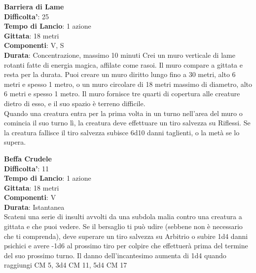 \begin{multicols}{2}
\medskip\textbf{Barriera di Lame}\\
\textbf{Difficolta'}: 25\\
\textbf{Tempo di Lancio}: 1 azione\\
\textbf{Gittata}: 18 metri\\
\textbf{Componenti}: V, S\\
\textbf{Durata}: Concentrazione, massimo 10 minuti Crei un muro verticale di lame rotanti fatte di energia magica, affilate come rasoi. Il muro compare a gittata e resta per la durata. Puoi creare un muro diritto lungo fino a 30 metri, alto 6 metri e spesso 1 metro, o un muro circolare di 18 metri massimo di diametro, alto 6 metri e spesso 1 metro. Il muro fornisce tre quarti di copertura alle creature dietro di esso, e il suo spazio è terreno difficile. \\
Quando una creatura entra per la prima volta in un turno nell’area del muro o comincia il suo turno lì, la creatura deve effettuare un tiro salvezza su Riflessi. Se la creatura fallisce il tiro salvezza subisce 6d10 danni taglienti, o la metà se lo supera.


\medskip\textbf{Beffa Crudele}\\
\textbf{Difficolta'}: 11\\
\textbf{Tempo di Lancio}: 1 azione\\
\textbf{Gittata}: 18 metri\\
\textbf{Componenti}: V\\
\textbf{Durata}: Istantanea\\
Scateni una serie di insulti avvolti da una subdola malia contro una creatura a gittata e che puoi vedere. Se il bersaglio ti può udire (sebbene non è necessario che ti comprenda), deve superare un tiro salvezza su Arbitrio o subire 1d4 danni psichici e avere -1d6 al prossimo tiro per colpire che effettuerà prima del termine del suo prossimo turno. Il danno dell’incantesimo aumenta di 1d4 quando raggiungi CM 5, 3d4 CM 11, 5d4 CM 17


\end{multicols}
